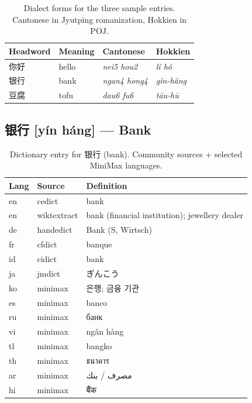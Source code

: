 \documentclass[11pt,a4paper]{article}
\newcommand{\ru}[1]{{\cyrfont #1}}
\newcommand{\ar}[1]{\foreignlanguage{arabic}{#1}}
\newcommand{\hi}[1]{\foreignlanguage{hindi}{#1}}
\newcommand{\thi}[1]{\foreignlanguage{thai}{#1}}
\begin{document}
\begin{table}[H]
\centering
\footnotesize
\begin{tabular}{llll}
\toprule
\textbf{Headword} & \textbf{Meaning} & \textbf{Cantonese} & \textbf{Hokkien} \\
\midrule
你好 & hello    & \textit{nei5 hou2}   & \textit{lí hó} \\
银行 & bank     & \textit{ngan4 hong4}  & \textit{gîn-hâng} \\
豆腐 & tofu     & \textit{dau6 fu6}     & \textit{tāu-hū} \\
\bottomrule
\end{tabular}
\caption{Dialect forms for the three sample entries. Cantonese in Jyutping romanization, Hokkien in POJ.}
\label{tab:dialect-samples}
\end{table}

\subsection{银行 [yín háng] --- Bank}

\begin{table}[H]
\centering
\footnotesize
\begin{tabular}{llp{3.6cm}}
\toprule
\textbf{Lang} & \textbf{Source} & \textbf{Definition} \\
\midrule
en & cedict & bank \\
en & wiktextract & bank (financial institution); jewellery dealer \\
de & handedict & Bank (S, Wirtsch) \\
fr & cfdict & banque \\
id & cidict & bank \\
ja & jmdict & ぎんこう \\
ko & minimax & 은행; 금융 기관 \\
es & minimax & banco \\
ru & minimax & \ru{банк} \\
vi & minimax & ngân hàng \\
tl & minimax & bangko \\
th & minimax & \thi{ธนาคาร} \\
ar & minimax & \ar{مصرف} / \ar{بنك} \\
hi & minimax & \hi{बैंक} \\
\bottomrule
\end{tabular}
\caption{Dictionary entry for 银行 (bank). Community sources + selected MiniMax languages.}
\end{table}
\end{document}
